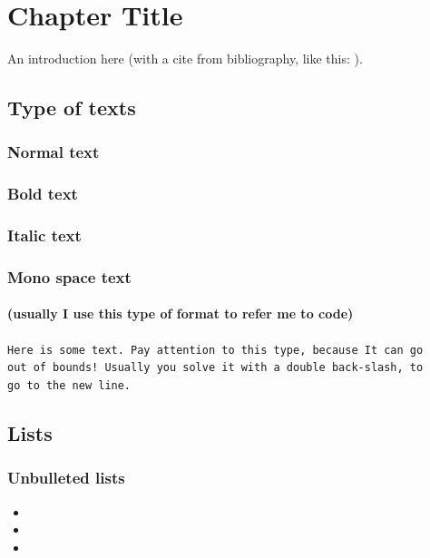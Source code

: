 \chapter{Chapter Title}

An introduction here (with a cite from bibliography, like this: \cite{greenwade93}).
\section{Type of texts}
\subsection{Normal text}
\lipsum[1]

\subsection{Bold text}
\textbf{\lipsum[1]}

\subsection{Italic text}
\textit{\lipsum[1]}

\subsection{Mono space text}
\subsubsection{(usually I use this type of format to refer me to code)}
\texttt{Here is some text. Pay attention to this type, because It can go 
\\ out of bounds! Usually you solve it with a double back-slash, to 
\\ go to the new line.}

\section{Lists}
\subsection{Unbulleted lists}
\begin{itemize}
    \item \lipsum[1]
    \item \lipsum[1]
    \item \lipsum[1]
\end{itemize}

